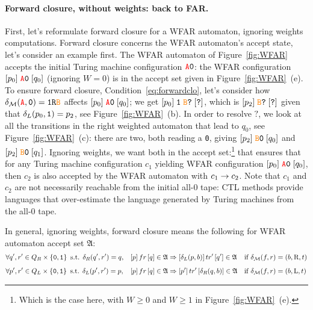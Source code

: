 \paragraph{Forward closure, without weights: back to FAR.} First, let's reformulate forward closure for a WFAR automaton, ignoring weights computations. Forward closure concerns the WFAR automaton's accept state, let's consider an example first. The WFAR automaton of Figure~\ref{fig:WFAR} accepts the initial Turing machine configuration $\texttt{\stateA}\szero$: the WFAR configuration $[p_0] \; \texttt{\stateA}\szero\; [q_0]$ (ignoring $W=0$) is in the accept set given in Figure~\ref{fig:WFAR}~(e). To ensure forward closure, Condition~\ref{eq:forwardclo}, let's consider how $\delta_\mathcal{M}(\texttt{\stateA},\szero) = \texttt{1R\stateB}$ affects $[p_0] \; \texttt{\stateA}\szero\; [q_0]$; we get $[p_0] \; \texttt{1}\; \texttt{\stateB}\texttt{?}\; [\texttt{?}]$, which is $[p_2] \; \texttt{\stateB}\texttt{?}\; [\texttt{?}]$ given that $\delta_L(p_0,\texttt{1}) = p_2$, see Figure~\ref{fig:WFAR}~(b). In order to resolve $\texttt{?}$, we look at all the transitions in the right weighted automaton that lead to $q_0$, see Figure~\ref{fig:WFAR}~(c): there are two, both reading a \texttt{0}, giving $[p_2] \; \texttt{\stateB}\texttt{0}\; [q_0]$ and $[p_2] \; \texttt{\stateB}\texttt{0}\; [q_1]$. Ignoring weights, we want both in the accept set:\footnote{Which is the case here, with $W\geq 0$ and $W \geq 1$ in Figure~\ref{fig:WFAR}~(e).} that ensures that for any Turing machine configuration $c_1$ yielding WFAR configuration $[p_0] \; \texttt{\stateA}\szero\; [q_0]$, then $c_2$ is also accepted by the WFAR automaton with $c_1 \to c_2$. Note that $c_1$ and $c_2$ are not necessarily reachable from the initial all-0 tape: CTL methods provide languages that over-estimate the language generated by Turing machines from the all-0 tape.

In general, ignoring weights, forward closure means the following for WFAR automaton accept set $\mathfrak{A}$:
\begin{align}
     & \forall q', r' \in Q_R \times \left\{\texttt{0},\texttt{1}\right\} \text{ s.t. } \delta_R(q', r') = q,
     &                                                                              & [p]\, fr\, [q] \in \mathfrak{A} \Rightarrow [\delta_L(p,b)]\, tr'\, [q'] \in \mathfrak{A}
     &                                                                              & \text{if } \delta_{\mathcal{M}}(f,r) = (b, \text{R}, t) \label{eq:forwardcloR}
    \\[0.5em]
     & \forall p', r' \in Q_L\times \left\{\texttt{0},\texttt{1}\right\} \text{ s.t. } \delta_L(p', r') = p,
     &                                                                              & [p]\, fr\, [q] \in \mathfrak{A} \Rightarrow [p']\, tr'\, [\delta_R(q,b)] \in \mathfrak{A}
     &                                                                              & \text{if } \delta_{\mathcal{M}}(f,r) = (b, \text{L}, t) \label{eq:forwardcloL}
\end{align}

